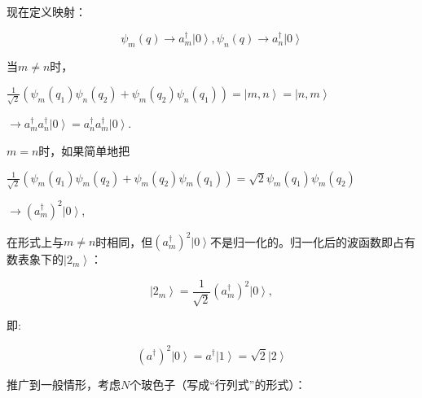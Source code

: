 现在定义映射：

\begin{equation*}
\psi_m(q) \to a_m^{\dagger} \left| 0 \right\rangle, \psi_n(q) \to
a_n^{\dagger} \left| 0 \right\rangle
\end{equation*}


当$m \ne n$时，

\begin{center}

$\frac{1}{{\sqrt 2 }}\left( {\psi _m (q_1 )\psi _n (q_2 ) + \psi _m
(q_2 )\psi _n (q_1 )} \right) = \left| {m,n} \right\rangle  = \left|
{n,m} \right\rangle $

$\to a_m^\dag  a_n^\dag  \left| 0 \right\rangle = a_n^\dag  a_m^\dag
\left| 0 \right\rangle $.

\end{center}

$m=n$时，如果简单地把

\begin{center}

$\frac{1}{{\sqrt 2 }}\left( {\psi _m (q_1 )\psi _m (q_2 ) + \psi _m
(q_2 )\psi _m (q_1 )} \right) = \sqrt 2 \psi _m (q_1 )\psi _m (q_2
)$

$\to \left( {a_m^\dag  } \right)^2 \left| 0 \right\rangle$,

\end{center}

在形式上与$m \ne n$时相同，但$\left( {a_m^\dag  } \right)^2 \left| 0
\right\rangle$不是归一化的。归一化后的波函数即占有数表象下的$\left|
{2_m } \right\rangle$：

\begin{equation}\label{two bosons}
\left| {2_m } \right\rangle  = \frac{1}{{\sqrt 2 }}\left( {a_m^\dag
} \right)^2 \left| 0 \right\rangle ,
\end{equation}


即:

\begin{equation*}
\left( {a^\dag  } \right)^2 \left| 0 \right\rangle  = a^\dag \left|
1 \right\rangle  = \sqrt 2 \left| 2 \right\rangle
\end{equation*}


推广到一般情形，考虑$N$个玻色子（写成“行列式”的形式）：


